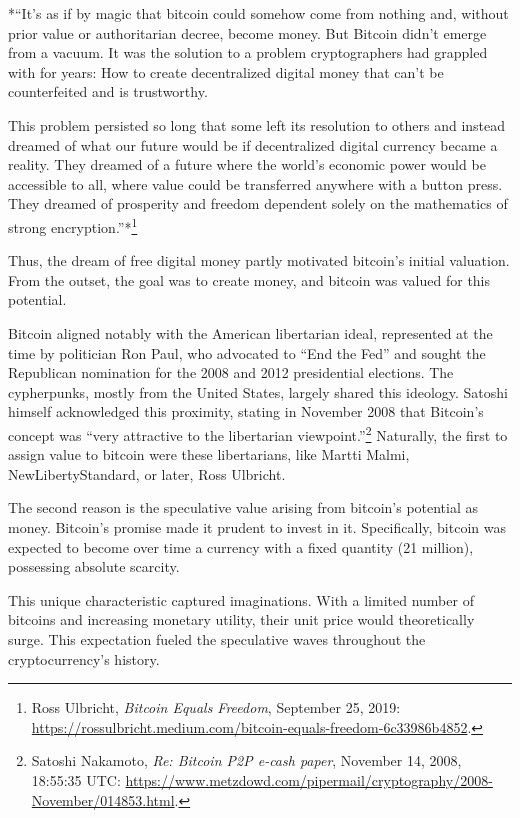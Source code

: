 \documentclass[
  a5paper,
  smalldemyvopaper,10pt,twoside,onecolumn,openright,extrafontsizes,hidelinks]{memoir}
\begin{document}
*``It's as if by magic that bitcoin could somehow come from nothing and,
without prior value or authoritarian decree, become money. But Bitcoin
didn't emerge from a vacuum. It was the solution to a problem
cryptographers had grappled with for years: How to create decentralized
digital money that can't be counterfeited and is trustworthy.

This problem persisted so long that some left its resolution to others
and instead dreamed of what our future would be if decentralized digital
currency became a reality. They dreamed of a future where the world's
economic power would be accessible to all, where value could be
transferred anywhere with a button press. They dreamed of prosperity and
freedom dependent solely on the mathematics of strong
encryption.''*\footnote{Ross Ulbricht, \emph{Bitcoin Equals Freedom},
  September 25, 2019:
  \url{https://rossulbricht.medium.com/bitcoin-equals-freedom-6c33986b4852}.}

Thus, the dream of free digital money partly motivated bitcoin's initial
valuation. From the outset, the goal was to create money, and bitcoin
was valued for this potential.

Bitcoin aligned notably with the American libertarian ideal, represented
at the time by politician Ron Paul, who advocated to ``End the Fed'' and
sought the Republican nomination for the 2008 and 2012 presidential
elections. The cypherpunks, mostly from the United States, largely
shared this ideology. Satoshi himself acknowledged this proximity,
stating in November 2008 that Bitcoin's concept was ``very attractive to
the libertarian viewpoint.''\footnote{Satoshi Nakamoto, \emph{Re:
  Bitcoin P2P e-cash paper}, November 14, 2008, 18:55:35 UTC:
  \url{https://www.metzdowd.com/pipermail/cryptography/2008-November/014853.html}.}
Naturally, the first to assign value to bitcoin were these libertarians,
like Martti Malmi, NewLibertyStandard, or later, Ross Ulbricht.

The second reason is the speculative value arising from bitcoin's
potential as money. Bitcoin's promise made it prudent to invest in it.
Specifically, bitcoin was expected to become over time a currency with a
fixed quantity (21 million), possessing absolute scarcity.

This unique characteristic captured imaginations. With a limited number
of bitcoins and increasing monetary utility, their unit price would
theoretically surge. This expectation fueled the speculative waves
throughout the cryptocurrency's history.
\end{document}
